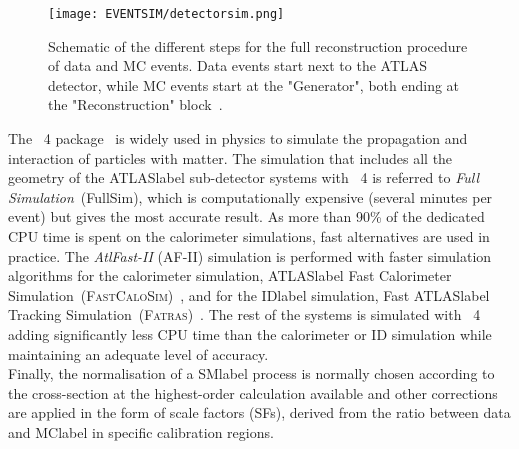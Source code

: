 \begin{figure}[htbp]
    \RawFloats
    \begin{center}
    \texttt{[image: EVENTSIM/detectorsim.png]}
    \caption{
        Schematic of the different steps for the full reconstruction procedure of data and MC events. Data events start next to the ATLAS detector, while MC events start at the "Generator", both ending at the "Reconstruction" block~\cite{Aad_2010}.}
    \label{figEVNTSIM:detectorsim}
    \end{center}
\end{figure}

The \GEANT~4 package~\cite{AGOSTINELLI2003250} is widely used in physics to simulate the propagation and interaction of particles with matter. The simulation that includes all the geometry of the \acrshort{ATLASlabel} sub-detector systems with \GEANT~4 is referred to \textit{Full Simulation}~(FullSim), which is computationally expensive (several minutes per event) but gives the most accurate result. As more than 90\% of the dedicated CPU time is spent on the calorimeter simulations, fast alternatives are used in practice. The \textit{AtlFast-II} (AF-II) simulation is performed with faster simulation algorithms for the calorimeter simulation, \acrshort{ATLASlabel} Fast Calorimeter Simulation~(\textsc{FastCaloSim})~\cite{ATLAS:1300517}, and for the \acrshort{IDlabel} simulation, Fast \acrshort{ATLASlabel} Tracking Simulation~(\textsc{Fatras})~\cite{Edmonds:1091969}. The rest of the systems is simulated with \GEANT~4 adding significantly less CPU time than the calorimeter or ID simulation while maintaining an adequate level of accuracy.\\

Finally, the normalisation of a \acrshort{SMlabel} process is normally chosen according to the cross-section at the highest-order calculation available and other corrections are applied in the form of scale factors (SFs), derived from the ratio between data and \acrshort{MClabel} in specific calibration regions.